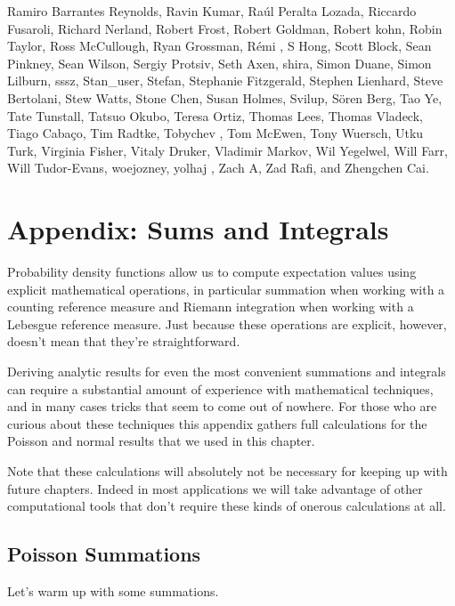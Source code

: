 \documentclass[
  letterpaper,
  DIV=11,
  numbers=noendperiod]{scrartcl}
\begin{document}
Ramiro Barrantes Reynolds, Ravin Kumar, Raúl Peralta Lozada, Riccardo
Fusaroli, Richard Nerland, Robert Frost, Robert Goldman, Robert kohn,
Robin Taylor, Ross McCullough, Ryan Grossman, Rémi , S Hong, Scott
Block, Sean Pinkney, Sean Wilson, Sergiy Protsiv, Seth Axen, shira,
Simon Duane, Simon Lilburn, sssz, Stan\_user, Stefan, Stephanie
Fitzgerald, Stephen Lienhard, Steve Bertolani, Stew Watts, Stone Chen,
Susan Holmes, Svilup, Sören Berg, Tao Ye, Tate Tunstall, Tatsuo Okubo,
Teresa Ortiz, Thomas Lees, Thomas Vladeck, Tiago Cabaço, Tim Radtke,
Tobychev , Tom McEwen, Tony Wuersch, Utku Turk, Virginia Fisher, Vitaly
Druker, Vladimir Markov, Wil Yegelwel, Will Farr, Will Tudor-Evans,
woejozney, yolhaj , Zach A, Zad Rafi, and Zhengchen Cai.

\hypertarget{sec:appendix}{%
\section*{Appendix: Sums and Integrals}\label{sec:appendix}}

Probability density functions allow us to compute expectation values
using explicit mathematical operations, in particular summation when
working with a counting reference measure and Riemann integration when
working with a Lebesgue reference measure. Just because these operations
are explicit, however, doesn't mean that they're straightforward.

Deriving analytic results for even the most convenient summations and
integrals can require a substantial amount of experience with
mathematical techniques, and in many cases tricks that seem to come out
of nowhere. For those who are curious about these techniques this
appendix gathers full calculations for the Poisson and normal results
that we used in this chapter.

Note that these calculations will absolutely not be necessary for
keeping up with future chapters. Indeed in most applications we will
take advantage of other computational tools that don't require these
kinds of onerous calculations at all.

\hypertarget{poisson-summations}{%
\subsection{Poisson Summations}\label{poisson-summations}}

Let's warm up with some summations.
\end{document}
